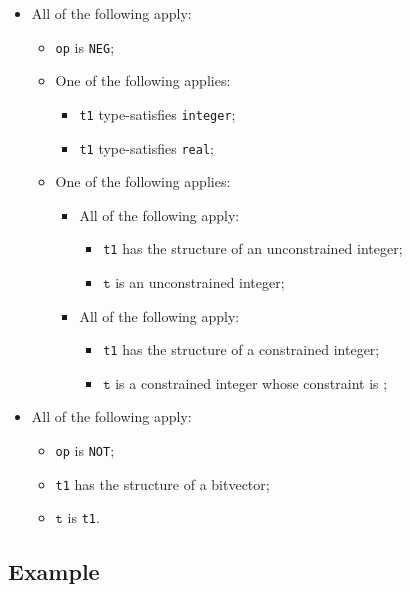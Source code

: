 \documentclass{book}
\newcommand\vt[0]{\texttt{t}}
\begin{document}
\begin{itemize}
  \item All of the following apply:
    \begin{itemize}
    \item \texttt{op} is \texttt{NEG};
    \item One of the following applies:
      \begin{itemize}
      \item \texttt{t1} type-satisfies \texttt{integer};
      \item \texttt{t1} type-satisfies \texttt{real};
      \end{itemize}
     \item One of the following applies:
       \begin{itemize}
       \item All of the following apply:
         \begin{itemize}
         \item \texttt{t1} has the structure of an unconstrained integer;
         \item $\vt$ is an unconstrained integer;
         \end{itemize}
       \item All of the following apply:
         \begin{itemize}
         \item \texttt{t1} has the structure of a constrained integer;
         \item $\vt$ is a constrained integer whose constraint is ;
         \end{itemize}
       \end{itemize}
    \end{itemize}

  \item All of the following apply:
    \begin{itemize}
    \item \texttt{op} is \texttt{NOT};
    \item \texttt{t1} has the structure of a bitvector;
    \item $\vt$ is \texttt{t1}.
    \end{itemize}
  \end{itemize}

  \subsection{Example}


\end{document}
